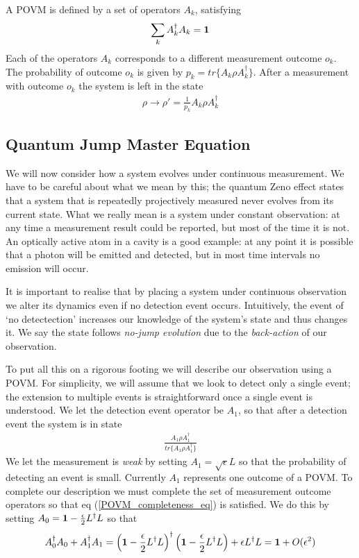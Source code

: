 A POVM  is defined by a set of operators $A_k$, satisfying
\begin{align}
  \label{POVM_completeness_eq}
  \sum_k A_k^\dagger A_k = \mathbf{1}
\end{align}
Each of the operators $A_k$ corresponds to a different measurement outcome $o_k$. The probability of outcome $o_k$ is given by $p_k = tr\{A_k \rho A_k^\dagger\}$. After a measurement with outcome $o_k$ the system is left in the state
\begin{align}
  \rho \rightarrow \rho' = \frac{1}{p_k} A_k \rho A_k^\dagger
\end{align}

\subsection{Quantum Jump Master Equation}

We will now consider how a system evolves under continuous measurement. We have to be careful about what we mean by this; the quantum Zeno effect \cite{quantum_zeno} states that a system that is repeatedly projectively measured never evolves from its current state. What we really mean is a system under constant observation: at any time a measurement result could be reported, but most of the time it is not. An optically active atom in a cavity is a good example: at any point it is possible that a photon will be emitted and detected, but in most time intervals no emission will occur.

It is important to realise that by placing a system under continuous observation we alter its dynamics even if no detection event occurs. Intuitively, the event of `no detectection' increases our knowledge of the system's state and thus changes it. We say the state follows \textit{no-jump evolution} due to the \textit{back-action} of our observation.

To put all this on a rigorous footing we will describe our observation using a POVM. For simplicity, we will assume that we look to detect only a single  event; the extension to multiple events is straightforward once a single event is understood. We let the detection event operator be $A_1$, so that after a detection event the system is in state
\begin{align}
  \frac{A_1 \rho A_1^\dagger}{tr\{A_1 \rho A_1^\dagger\}}
\end{align}
We let the measurement is \textit{weak} by setting $A_1 = \sqrt{\epsilon} L$ so that the probability of detecting an event is small. Currently $A_1$ represents one outcome of a POVM. To complete our description we must complete the set of measurement outcome operators so that eq (\ref{POVM_completeness_eq}) is satisfied. We do this by setting $A_0 = \mathbf{1} - \frac{\epsilon}{2} L^\dagger L$ so that
\begin{align}
  A_0^\dagger A_0 + A_1^\dagger A_1 = \left( \mathbf{1} - \frac{\epsilon}{2} L^\dagger L\right)^\dagger \left( \mathbf{1} - \frac{\epsilon}{2} L^\dagger L\right) + \epsilon L^\dagger L = \mathbf{1} + O(\epsilon^2)
\end{align}

